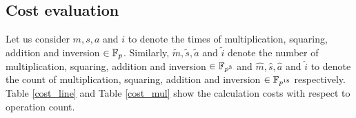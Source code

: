 \subsection{Cost evaluation}
Let us consider $m, s, a$ and $i$ to denote the times of multiplication, squaring, addition and inversion $\in {\mathbb{F}}_{p}$. Similarly, $\tilde{m},\tilde{s},\tilde{a}$ and $\tilde{i}$ denote the number of multiplication, squaring, addition and inversion $\in \mathbb{F}_{p^{3}}$ and $\hat{m},\hat{s},\hat{a}$ and $\hat{i}$ to denote the count of multiplication, squaring, addition and inversion $\in \mathbb{F}_{p^{18}}$ respectively.
Table \ref{cost_line} and Table \ref{cost_mul} show the calculation costs with respect to operation count.
\renewcommand{\baselinestretch}{1.5}
\begin{table}[htb]
	\begin{center}
		\caption{Operation count of line evaluation}
		\label{cost_line}
	\end{center}
\end{table}
\begin{table}[htb]
	\begin{center}
		\caption{Operation count of multiplication}
		\label{cost_mul}
	\end{center}
\end{table}
\renewcommand{\baselinestretch}{1.0}

